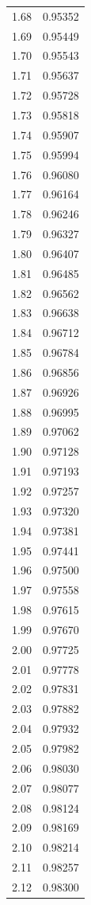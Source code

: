 \documentclass[
  letterpaper,
  DIV=11,
  numbers=noendperiod]{scrartcl}
\begin{document}
\begin{longtable}[]{@{}cc@{}}
1.68 & 0.95352 \\
1.69 & 0.95449 \\
1.70 & 0.95543 \\
1.71 & 0.95637 \\
1.72 & 0.95728 \\
1.73 & 0.95818 \\
1.74 & 0.95907 \\
1.75 & 0.95994 \\
1.76 & 0.96080 \\
1.77 & 0.96164 \\
1.78 & 0.96246 \\
1.79 & 0.96327 \\
1.80 & 0.96407 \\
1.81 & 0.96485 \\
1.82 & 0.96562 \\
1.83 & 0.96638 \\
1.84 & 0.96712 \\
1.85 & 0.96784 \\
1.86 & 0.96856 \\
1.87 & 0.96926 \\
1.88 & 0.96995 \\
1.89 & 0.97062 \\
1.90 & 0.97128 \\
1.91 & 0.97193 \\
1.92 & 0.97257 \\
1.93 & 0.97320 \\
1.94 & 0.97381 \\
1.95 & 0.97441 \\
1.96 & 0.97500 \\
1.97 & 0.97558 \\
1.98 & 0.97615 \\
1.99 & 0.97670 \\
2.00 & 0.97725 \\
2.01 & 0.97778 \\
2.02 & 0.97831 \\
2.03 & 0.97882 \\
2.04 & 0.97932 \\
2.05 & 0.97982 \\
2.06 & 0.98030 \\
2.07 & 0.98077 \\
2.08 & 0.98124 \\
2.09 & 0.98169 \\
2.10 & 0.98214 \\
2.11 & 0.98257 \\
2.12 & 0.98300 \\

\end{longtable}
\end{document}
